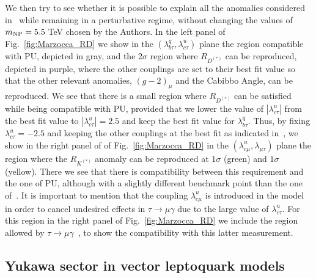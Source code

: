 \documentclass[a4paper,11pt]{article}
\begin{document}
 
 We then try to see whether it is possible to explain all the anomalies considered in~\cite{Marzocca:2021azj} while remaining in a perturbative regime, without changing the values of $m_{{\rm NP}}=5.5\;$TeV chosen by the Authors.  In the left panel of Fig.~\ref{fig:Marzocca_RD} we show in the $( \lambda_{b\tau}^q , \lambda_{c\tau}^u )$ plane the region compatible with PU, depicted in gray, and the $2\sigma$ region where $R_{D^{(*)}}$ can be reproduced, depicted in purple, where the other couplings are set to their best fit value so that the other relevant anomalies,
 $(g-2)_\mu$ and the Cabibbo Angle,  can be reproduced. We see that there is a small region where $R_{D^{(*)}}$ can be satisfied while being compatible with PU, provided that we lower the value of $|\lambda_{c\tau}^u|$ from the best fit value to $|\lambda_{c\tau}^u|=2.5$ and keep the best fit value for $ \lambda_{b\tau}^q$.
 Thus, by fixing $\lambda_{c\tau}^u=-2.5$  and keeping the other couplings at the best fit as indicated in~\cite{Marzocca:2021azj},  we show in the right panel of  of Fig.~\ref{fig:Marzocca_RD}  in the  $(\lambda_{c\mu}^u,\lambda_{\mu\tau})$ plane the region where the $R_{K^{(*)}}$ anomaly can be reproduced at $1\sigma$ (green) and $1\sigma$ (yellow). There we see that there is compatibility between this requirement and the one of PU, although with a slightly different benchmark point than the one of~\cite{Marzocca:2021azj}. It is important to mention that the coupling 
 $\lambda_{c\mu}^u$ is introduced in the model in order to cancel undesired effects in $\tau \to \mu \gamma$ due to the large value of $\lambda_{c\tau}^u$. For this region
in the right panel of Fig.~\ref{fig:Marzocca_RD} we include the region allowed by $\tau \to \mu \gamma$~\cite{Zyla:2020zbs}, to show the compatibility with this latter measurement.
 


 
 



\subsection{Yukawa sector in vector leptoquark models}
\end{document}
